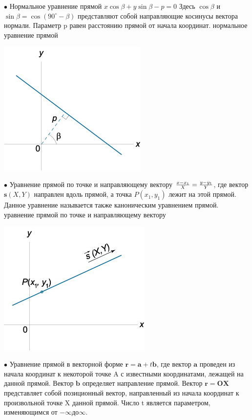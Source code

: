 \documentclass[oneside]{book}
\begin{document}
\begin{itemize}
\begin{enumerate}
$\bullet$ Нормальное уравнение прямой  
$x\cos \beta + y\sin \beta - p = 0$
Здесь $\cos \beta$ и $\sin\beta = \cos \left( {90^\circ - \beta} \right)$ представляют собой направляющие косинусы вектора нормали. Параметр p равен расстоянию прямой от начала координат.
нормальное уравнение прямой
\begin{center}
\includegraphics[scale=0.4]{./pics/8.jpg}
\end{center}

$\bullet$ Уравнение прямой по точке и направляющему вектору  
$\large\frac{{x - {x_1}}}{X}\normalsize = \large\frac{{y - {y_1}}}{Y}\normalsize$,
где вектор $\mathbf{s}\left( {X,Y} \right)$ направлен вдоль прямой, а точка $P\left( {{x_1},{y_1}} \right)$ лежит на этой прямой. Данное уравнение называется также каноническим уравнением прямой.
уравнение прямой по точке и направляющему вектору

\begin{center}
\includegraphics[scale=0.4]{./pics/9.jpg}
\end{center}

$\bullet$ Уравнение прямой в векторной форме
$\mathbf{r}= \mathbf{a} + t\mathbf{b}$,
где вектор $\mathbf{a}$ проведен из начала координат к некоторой точке A с известными координатами, лежащей на данной прямой. Вектор $\mathbf{b}$ определяет направление прямой. Вектор $\mathbf{r} = \mathbf{OX}$ представляет собой позиционный вектор, направленный из начала координат к произвольной точке X данной прямой. Число t является параметром, изменяющимся от $- \infty $до$ \infty$.


\end{enumerate}
\end{itemize}
\end{document}
